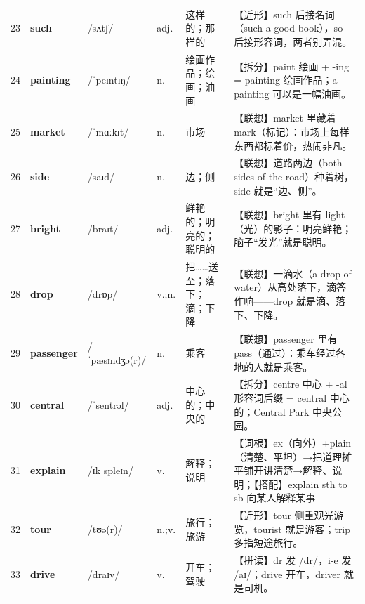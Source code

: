 \documentclass[UTF8,a4paper,11pt,oneside]{ctexbook}
\newcommand{\cellword}[1]{{\bfseries\textcolor{wordcol}{#1}}}
\newcommand{\cellipa}[1]{{\footnotesize\textcolor{ipacol}{#1}}}
\newcommand{\cellpos}[1]{\textcolor{poscol}{#1}}
\newcommand{\cellno}[1]{\textcolor{volcolor!75!black}{#1}}
\begin{document}
{\begin{longtable}{@{}C{0.045\textwidth}L{0.155\textwidth}L{0.175\textwidth}C{0.070\textwidth}L{0.180\textwidth}L{0.282\textwidth}@{}}
 \cellno{23} & \cellword{such} & \cellipa{/sʌtʃ/} & \cellpos{adj.} & 这样的；那样的 & \textcolor{tagNear}{【近形】}such 后接名词（such a good book），so 后接形容词，两者别弄混。 \\
\cellno{24} & \cellword{painting} & \cellipa{/ˈpeɪntɪŋ/} & \cellpos{n.} & 绘画作品；绘画；油画 & \textcolor{tagSplit}{【拆分】}paint 绘画 + -ing = painting 绘画作品；a painting 可以是一幅油画。 \\
 \cellno{25} & \cellword{market} & \cellipa{/ˈmɑːkɪt/} & \cellpos{n.} & 市场 & \textcolor{tagAssoc}{【联想】}market 里藏着 mark（标记）：市场上每样东西都标着价，热闹非凡。 \\
\cellno{26} & \cellword{side} & \cellipa{/saɪd/} & \cellpos{n.} & 边；侧 & \textcolor{tagAssoc}{【联想】}道路两边（both sides of the road）种着树，side 就是“边、侧”。 \\
 \cellno{27} & \cellword{bright} & \cellipa{/braɪt/} & \cellpos{adj.} & 鲜艳的；明亮的；聪明的 & \textcolor{tagAssoc}{【联想】}bright 里有 light（光）的影子：明亮鲜艳；脑子“发光”就是聪明。 \\
\cellno{28} & \cellword{drop} & \cellipa{/drɒp/} & \cellpos{v.;\allowbreak{}n.} & 把……送至；落下；滴；下降 & \textcolor{tagAssoc}{【联想】}一滴水（a drop of water）从高处落下，滴答作响——drop 就是滴、落下、下降。 \\
 \cellno{29} & \cellword{passenger} & \cellipa{/ˈpæsɪndʒə(r)/} & \cellpos{n.} & 乘客 & \textcolor{tagAssoc}{【联想】}passenger 里有 pass（通过）：乘车经过各地的人就是乘客。 \\
\cellno{30} & \cellword{central} & \cellipa{/ˈsentrəl/} & \cellpos{adj.} & 中心的；中央的 & \textcolor{tagSplit}{【拆分】}centre 中心 + -al 形容词后缀 = central 中心的；Central Park 中央公园。 \\
 \cellno{31} & \cellword{explain} & \cellipa{/ɪkˈspleɪn/} & \cellpos{v.} & 解释；说明 & \textcolor{tagRoot}{【词根】}ex（向外）+plain（清楚、平坦）→\allowbreak{}把道理摊平铺开讲清楚→\allowbreak{}解释、说明；\textcolor{tagColloc}{【搭配】}explain sth to sb 向某人解释某事 \\
\cellno{32} & \cellword{tour} & \cellipa{/tʊə(r)/} & \cellpos{n.;\allowbreak{}v.} & 旅行；旅游 & \textcolor{tagNear}{【近形】}tour 侧重观光游览，tourist 就是游客；trip 多指短途旅行。 \\
 \cellno{33} & \cellword{drive} & \cellipa{/draɪv/} & \cellpos{v.} & 开车；驾驶 & \textcolor{tagSpell}{【拼读】}dr 发 /dr/，i-e 发 /aɪ/；drive 开车，driver 就是司机。 \\
\end{longtable}
}
\end{document}
